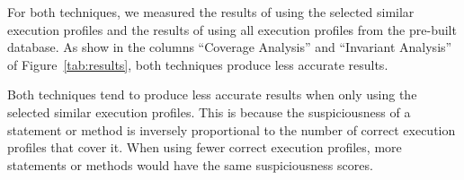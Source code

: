 





For both techniques, we measured the results of using the selected
similar execution profiles and the results of using
all execution profiles from the pre-built
database. As show in the columns ``Coverage Analysis'' and ``Invariant Analysis''
of Figure~\ref{tab:results}, both techniques produce less accurate results.

Both techniques tend to produce less accurate results when only
using the selected similar execution profiles. This is because
the suspiciousness of a statement or method
is inversely proportional to the number of correct execution profiles that cover
it. When using fewer correct execution profiles,
more statements or methods would have the same suspiciousness scores.

